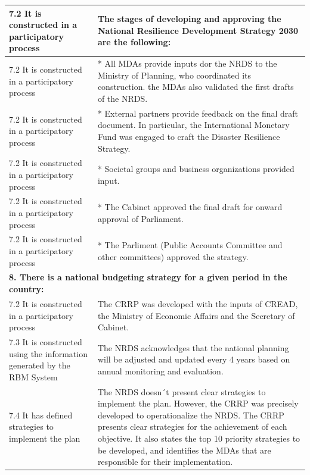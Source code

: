 \documentclass[
  10pt,
]{book}
\begin{document}
\begin{table}
\begin{tabular}[t]{l|l}
\hline
\hspace{1em}7.2 It is constructed in a participatory process & The stages of developing and approving the National Resilience Development Strategy 2030 are the following:\\
\hline
\hspace{1em}7.2 It is constructed in a participatory process & * All MDAs provide inputs dor the NRDS to the Ministry of Planning, who coordinated its construction. the MDAs also validated the first drafts of the NRDS.\\
\hline
\hspace{1em}7.2 It is constructed in a participatory process & * External partners provide feedback on the final draft document. In particular, the International Monetary Fund was engaged to craft the Disaster Resilience Strategy.\\
\hline
\hspace{1em}7.2 It is constructed in a participatory process & * Societal groups and business organizations provided input.\\
\hline
\hspace{1em}7.2 It is constructed in a participatory process & * The Cabinet approved the final draft for onward approval of Parliament.\\
\hline
\hspace{1em}7.2 It is constructed in a participatory process & * The Parliment (Public Accounts Committee and other committees) approved the strategy.\\
\hline
\multicolumn{2}{l}{\textbf{8. There is a national budgeting strategy for a given period in the country:}}\\
\hline
\hspace{1em}7.2 It is constructed in a participatory process & The CRRP was developed with the inputs of CREAD, the Ministry of Economic Affairs and the Secretary of Cabinet.\\
\hline
\hspace{1em}7.3 It is constructed using the information generated by the RBM System & The NRDS acknowledges that the national planning will be adjusted and updated every 4 years based on annual monitoring and evaluation.\\
\hline
\hspace{1em}7.4 It has defined strategies to implement the plan & The NRDS doesn´t present clear strategies to implement the plan. However, the CRRP was precisely developed to operationalize the NRDS. The CRRP presents clear strategies for the achievement of each objective. It also states the top 10 priority strategies to be developed, and identifies the MDAs that are responsible for their implementation.\\

\end{tabular}
\end{table}
\end{document}
